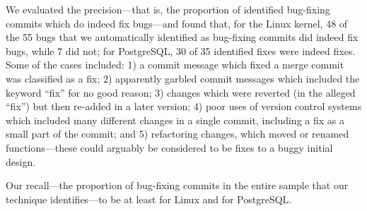 \begin{table}[tbh]
\centering
\small
{}
\caption{\label{tbl-confusion}Confusion matrices}
\end{table}


We evaluated the precision---that is, the proportion of identified bug-fixing
commits which do indeed fix bugs---and found that, for the Linux kernel, 48 of
the 55 bugs that we automatically identified as bug-fixing commits did indeed
fix bugs, while 7 did not; for PostgreSQL, 30 of 35 identified fixes were indeed
fixes. Some of the cases included: 1) a commit message which fixed a merge
commit was classified as a fix; 2) apparently garbled commit messages which
included the keyword ``fix'' for no good reason; 3) changes which were reverted
(in the alleged ``fix'') but then re-added in a later version; 4) poor uses of
version control systems which included many different changes in a single
commit, including a fix as a small part of the commit; and 5) refactoring
changes, which moved or renamed functions---these could arguably be considered
to be fixes to a buggy initial design.

Our recall---the proportion of bug-fixing commits in the entire sample that our
technique identifies---to be at least \linuxR for Linux and \postR for
PostgreSQL.

